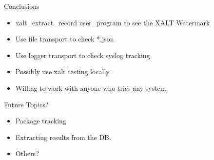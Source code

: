 \documentclass{beamer}
\begin{document}
\begin{frame}{Conclusions}
  \begin{itemize}
    \item xalt\_extract\_record user\_program to see the XALT
      Watermark
    \item Use file transport to check *.json
    \item Use logger transport to check syslog tracking
    \item Possibly use xalt testing locally.
    \item Willing to work with anyone who tries any system.
  \end{itemize}
\end{frame}


\begin{frame}{Future Topics?} 
  \begin{itemize}
    \item Package tracking
    \item Extracting results from the DB.
    \item Others?
  \end{itemize}
\end{frame}
%

%
\end{document}
